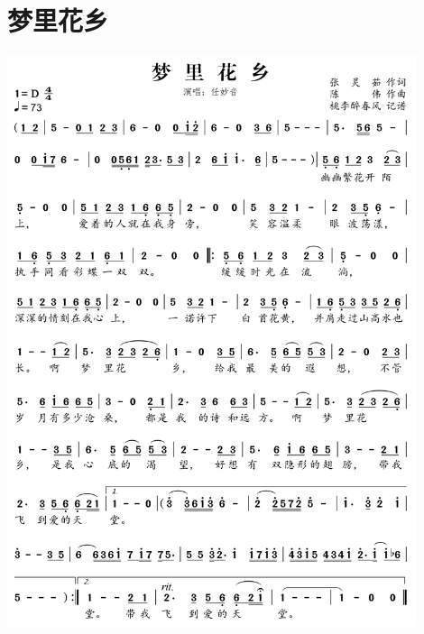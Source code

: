 \documentclass[cn,pad,twocol]{elegantbook}
\begin{document}
\section{梦里花乡} \includegraphics[width=0.9\textwidth]{rpi400/20210212梦里花乡.png}
\end{document}
